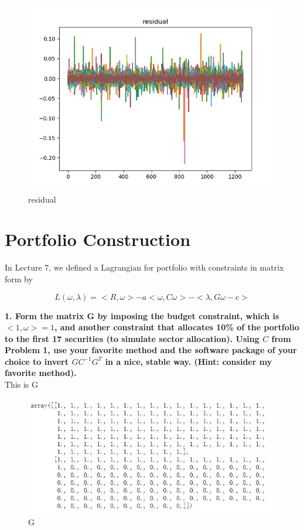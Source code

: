 \documentclass{winnower}
\begin{document}
\begin{figure}[!h]
\begin{center}
\includegraphics[scale=0.5]{1_3.jpg}
\caption
{residual}
\label{fig:f1}
\end{center}
\end{figure}


\newpage

\section{ Portfolio Construction}

\indent In Lecture 7, we defined a Lagrangian for portfolio with constraints in matrix form by

$$L(\omega,\lambda)=<R,\omega>-a<\omega,C\omega>-<\lambda,G\omega-c>$$

\textbf{1. Form the matrix G by imposing the budget constraint, which is $<1,\omega>=1$, and another constraint that allocates 10\% of the portfolio to the first 17 securities (to simulate sector allocation). Using $C$ from Problem 1, use your favorite method and the software package of your choice to invert $GC^{-1}G^T$ in a nice, stable way. (Hint: consider my favorite method).}
\\

This is G

\begin{figure}[!h]
\begin{center}
\includegraphics[scale=0.8]{1_4.jpg}
\caption
{G}
\label{fig:f1}
\end{center}
\end{figure}
\end{document}
